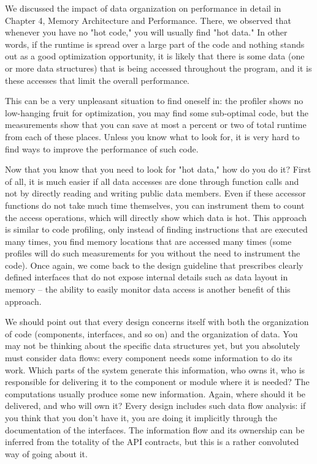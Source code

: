 We discussed the impact of data organization on performance in detail in Chapter 4, Memory Architecture and Performance. There, we observed that whenever you have no "hot code," you will usually find "hot data." In other words, if the runtime is spread over a large part of the code and nothing stands out as a good optimization opportunity, it is likely that there is some data (one or more data structures) that is being accessed throughout the program, and it is these accesses that limit the overall performance.

This can be a very unpleasant situation to find oneself in: the profiler shows no low-hanging fruit for optimization, you may find some sub-optimal code, but the measurements show that you can save at most a percent or two of total runtime from each of these places. Unless you know what to look for, it is very hard to find ways to improve the performance of such code. 

Now that you know that you need to look for "hot data," how do you do it? First of all, it is much easier if all data accesses are done through function calls and not by directly reading and writing public data members. Even if these accessor functions do not take much time themselves, you can instrument them to count the access operations, which will directly show which data is hot. This approach is similar to code profiling, only instead of finding instructions that are executed many times, you find memory locations that are accessed many times (some profiles will do such measurements for you without the need to instrument the code). Once again, we come back to the design guideline that prescribes clearly defined interfaces that do not expose internal details such as data layout in memory – the ability to easily monitor data access is another benefit of this approach.

We should point out that every design concerns itself with both the organization of code (components, interfaces, and so on) and the organization of data. You may not be thinking about the specific data structures yet, but you absolutely must consider data flows: every component needs some information to do its work. Which parts of the system generate this information, who owns it, who is responsible for delivering it to the component or module where it is needed? The computations usually produce some new information. Again, where should it be delivered, and who will own it? Every design includes such data flow analysis: if you think that you don't have it, you are doing it implicitly through the documentation of the interfaces. The information flow and its ownership can be inferred from the totality of the API contracts, but this is a rather convoluted way of going about it. 

